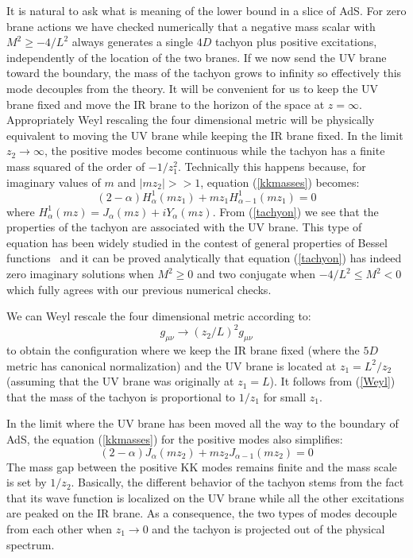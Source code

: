\documentclass[a4paper,12pt,dvips]{article}
\begin{document}
It is natural to ask what is meaning of the lower bound in a slice
of AdS. For zero brane actions we have checked numerically that a
negative mass scalar with $M^2\geq-4/L^2$ always generates a
single $4D$ tachyon plus positive excitations, independently of
the location of the two branes. If we now send the UV brane toward
the boundary, the mass of the tachyon grows to infinity so
effectively this mode decouples from the theory. It will be
convenient for us to keep the UV brane fixed and move the IR brane
to the horizon of the space at $z=\infty$. Appropriately Weyl
rescaling the four dimensional metric will be physically
equivalent to moving the UV brane while keeping the IR brane
fixed. In the limit $z_2\to \infty$, the positive modes become
continuous while the tachyon has a finite mass squared of the
order of $-1/z_1^2$. Technically this happens because, for
imaginary values of $m$ and $|mz_2| >> 1$, equation
(\ref{kkmasses}) becomes:
\begin{equation}
(2-\alpha)H^1_\alpha(m z_1)+ m z_1 H^1_{\alpha - 1}(m z_1)=0
\label{tachyon}
\end{equation}
where $H^1_\alpha(m z) =J_\alpha(m z)+i Y_\alpha(m z)$. From
(\ref{tachyon}) we see that the properties of the tachyon are
associated with the UV brane. This type of equation has been
widely studied in the contest of general properties of Bessel
functions~\cite{bessel} and it can be proved analytically that
equation (\ref{tachyon}) has indeed zero imaginary solutions when
$M^2\ge 0$ and two conjugate when $-4/L^2 \le M^2 <0$ which fully
agrees with our previous numerical checks.

 We
can Weyl rescale the four dimensional metric according to:
\begin{equation}
g_{\mu \nu} \to (z_2/L)^2g_{\mu \nu}
\label{Weyl}
\end{equation}
to obtain the configuration where we keep the IR brane fixed
(where the $5D$ metric has canonical normalization) and the UV
brane is located at $z_1=L^2/z_2$ (assuming that the UV brane
was originally at $z_1=L$). It follows from (\ref{Weyl}) that the
mass of the tachyon is proportional to $1/z_1$ for small $z_1$.

In the limit where the UV brane has been moved all the way to the
boundary of AdS, the equation (\ref{kkmasses})  for the positive
modes also simplifies:
\begin{equation}
(2-\alpha)J_\alpha(m z_2)+m z_2 J_{\alpha-1}(m z_2)=0
\end{equation}
The mass gap between the positive KK modes remains finite and the
mass scale is set by $1/z_2$. Basically, the different behavior of
the tachyon stems from the fact that its wave function is
localized on the UV brane while all the other excitations are
peaked on the IR brane. As a consequence, the two types of modes
decouple from each other when $z_1 \to 0$ and the tachyon is
projected out of the physical spectrum.
\end{document}
